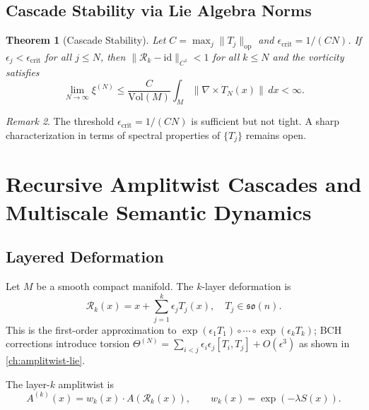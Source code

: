 \documentclass[12pt,a4paper,oneside]{book}
\numberwithin{equation}{chapter}
\theoremstyle{plain}
\newtheorem{theorem}{Theorem}[chapter]
\theoremstyle{definition}
\theoremstyle{remark}
\newtheorem{remark}[theorem]{Remark}
\begin{document}
\section{Cascade Stability via Lie Algebra Norms}

\begin{theorem}[Cascade Stability]
\label{thm:cascade-stability}
Let $C = \max_j\|T_j\|_{\mathrm{op}}$ and $\epsilon_\mathrm{crit}
= 1/(CN)$. If $\epsilon_j < \epsilon_\mathrm{crit}$ for all
$j \leq N$, then $\|\mathcal{R}_k - \mathrm{id}\|_{C^1} < 1$ for
all $k \leq N$ and the vorticity satisfies
\[
\lim_{N\to\infty} \xi^{(N)} \leq
\frac{C}{\mathrm{Vol}(M)}\int_M \|\nabla \times T_N(x)\|\,dx < \infty.
\]
\end{theorem}

\begin{remark}
The threshold $\epsilon_\mathrm{crit} = 1/(CN)$ is sufficient but
not tight. A sharp characterization in terms of spectral properties
of $\{T_j\}$ remains open.
\end{remark}


\chapter[Recursive Cascades and Semantic Dynamics]{Recursive Amplitwist Cascades and Multiscale Semantic Dynamics}
\label{ch:cascades}

\section{Layered Deformation}

Let $M$ be a smooth compact manifold. The $k$-layer deformation is
\[
\mathcal{R}_k(x) = x + \sum_{j=1}^k \epsilon_j T_j(x), \quad
T_j \in \mathfrak{so}(n).
\]
This is the first-order approximation to $\exp(\epsilon_1 T_1)\circ
\cdots \circ \exp(\epsilon_k T_k)$; BCH corrections introduce
torsion $\Theta^{(N)} = \sum_{i<j}\epsilon_i\epsilon_j[T_i,T_j]
+ O(\epsilon^3)$ as shown in \cref{ch:amplitwist-lie}.

The layer-$k$ amplitwist is
\[
A^{(k)}(x) = w_k(x)\cdot A(\mathcal{R}_k(x)), \qquad
w_k(x) = \exp(-\lambda S(x)).
\]
\end{document}

